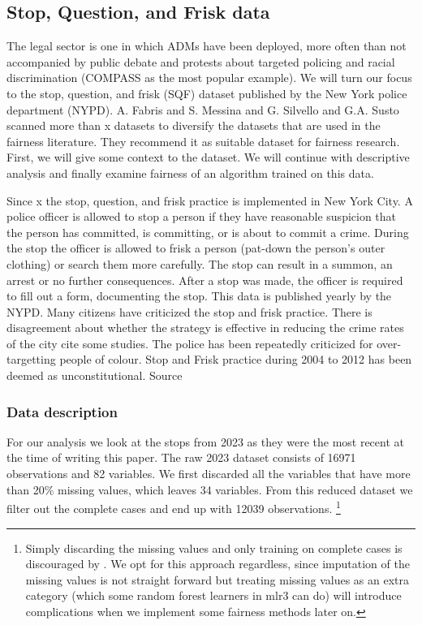 \subsection*{Stop, Question, and Frisk data}

The legal sector is one in which ADMs have been deployed, more often than not accompanied by public debate and protests about targeted policing and racial discrimination (COMPASS as the most popular example). We will turn our focus to the stop, question, and frisk (SQF) dataset published by the New York police department (NYPD). A. Fabris and S. Messina and G. Silvello and G.A. Susto scanned more than x datasets to diversify the datasets that are used in the fairness literature. They recommend it as suitable dataset for fairness research. First, we will give some context to the dataset. We will continue with descriptive analysis and finally examine fairness of an algorithm trained on this data.

Since x the stop, question, and frisk practice is implemented in New York City. A police officer is allowed to stop a person if they have reasonable suspicion that the person has committed, is committing, or is about to commit a crime.
During the stop the officer is allowed to frisk a person (pat-down the person's outer clothing) or search them more carefully.
The stop can result in a summon, an arrest or no further consequences. After a stop was made, the officer is required to fill out a form, documenting the stop. This data is published yearly by the NYPD.
Many citizens have criticized the stop and frisk practice. There is disagreement about whether the strategy is effective in reducing the crime rates of the city {\color{red}cite some studies}. The police has been repeatedly criticized for over-targetting people of colour.
Stop and Frisk practice during 2004 to 2012 has been deemed as unconstitutional. {\color{red} Source}

\subsubsection*{Data description}
For our analysis we look at the stops from 2023 as they were the most recent at the time of writing this paper. The raw 2023 dataset consists of 16971 observations and 82 variables. We first discarded all the variables that have more than 20\% missing values, which leaves 34 variables.
From this reduced dataset we filter out the complete cases and end up with 12039 observations. \footnote{Simply discarding the missing values and only training on complete cases is discouraged by \cite{fernando2021}. We opt for this approach regardless, since imputation of the missing values is not straight forward
but treating missing values as an extra category (which some random forest learners in mlr3 can do) will introduce complications when we implement some fairness methods later on.}

